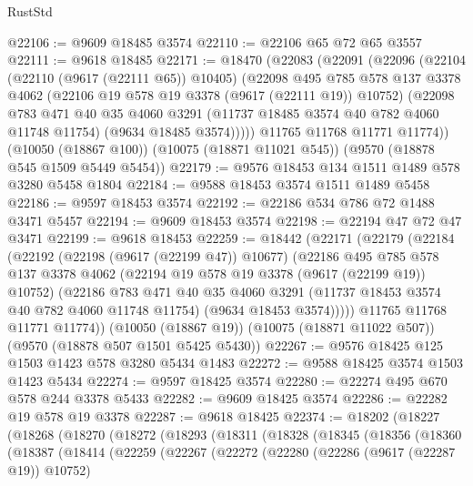 \begin{lexlean}{RustStd}
\begin{coremodule}
@22106 := @9609 @18485 @3574
@22110 := @22106 @65 @72 @65 @3557
@22111 := @9618 @18485
@22171 := @18470
    (@22083
      (@22091
        (@22096
          (@22104
            (@22110 (@9617 (@22111 @65)) @10405)
            (@22098
              @495
              @785
              @578
              @137
              @3378
              @4062
              (@22106 @19 @578 @19 @3378 (@9617 (@22111 @19)) @10752)
              (@22098
                @783
                @471
                @40
                @35
                @4060
                @3291
                (@11737 @18485 @3574 @40 @782 @4060 @11748 @11754)
                (@9634 @18485 @3574)))))
        @11765
        @11768
        @11771
        @11774))
    (@10050 (@18867 @100))
    (@10075 (@18871 @11021 @545))
    (@9570 (@18878 @545 @1509 @5449 @5454))
@22179 := @9576 @18453 @134 @1511 @1489 @578 @3280 @5458 @1804
@22184 := @9588 @18453 @3574 @1511 @1489 @5458
@22186 := @9597 @18453 @3574
@22192 := @22186 @534 @786 @72 @1488 @3471 @5457
@22194 := @9609 @18453 @3574
@22198 := @22194 @47 @72 @47 @3471
@22199 := @9618 @18453
@22259 := @18442
    (@22171
      (@22179
        (@22184
          (@22192
            (@22198 (@9617 (@22199 @47)) @10677)
            (@22186
              @495
              @785
              @578
              @137
              @3378
              @4062
              (@22194 @19 @578 @19 @3378 (@9617 (@22199 @19)) @10752)
              (@22186
                @783
                @471
                @40
                @35
                @4060
                @3291
                (@11737 @18453 @3574 @40 @782 @4060 @11748 @11754)
                (@9634 @18453 @3574)))))
        @11765
        @11768
        @11771
        @11774))
    (@10050 (@18867 @19))
    (@10075 (@18871 @11022 @507))
    (@9570 (@18878 @507 @1501 @5425 @5430))
@22267 := @9576 @18425 @125 @1503 @1423 @578 @3280 @5434 @1483
@22272 := @9588 @18425 @3574 @1503 @1423 @5434
@22274 := @9597 @18425 @3574
@22280 := @22274 @495 @670 @578 @244 @3378 @5433
@22282 := @9609 @18425 @3574
@22286 := @22282 @19 @578 @19 @3378
@22287 := @9618 @18425
@22374 := @18202
    (@18227
      (@18268
        (@18270
          (@18272
            (@18293
              (@18311
                (@18328
                  (@18345
                    (@18356
                      (@18360
                        (@18387
                          (@18414
                            (@22259
                              (@22267
                                (@22272
                                  (@22280
                                    (@22286 (@9617 (@22287 @19)) @10752)

\end{coremodule}
\end{lexlean}
